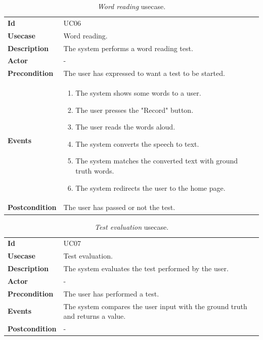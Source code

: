 \begin{table}[h!t]
    \centering
    \caption{\emph{Word reading} usecase.}
    \label{tab:uc:word}
    \centering
    \begin{tabular}{l | p{80mm}}
        \textbf{Id}            & UC06                                                 \\
        \textbf{Usecase}       & Word reading.                                        \\
        \textbf{Description}   & The system performs a word reading test.             \\
        \textbf{Actor}         & -                                                    \\
        \textbf{Precondition}  & The user has expressed to want a test to be started. \\
        \textbf{Events}        & \begin{enumerate}
            \item The system shows some words to a user.
            \item The user presses the "Record" button.
            \item The user reads the words aloud.
            \item The system converts the speech to text.
            \item The system matches the converted text with ground truth words.
            \item The system redirects the user to the home page.
        \end{enumerate}                           \\
        \textbf{Postcondition} & The user has passed or not the test.
    \end{tabular}
\end{table}

\begin{table}[h!t]
    \centering
    \caption{\emph{Test evaluation} usecase.}
    \label{tab:uc:evaluation}
    \centering
    \begin{tabular}{l | p{80mm}}
        \textbf{Id}            & UC07                                                                          \\
        \textbf{Usecase}       & Test evaluation.                                                              \\
        \textbf{Description}   & The system evaluates the test performed by the user.                          \\
        \textbf{Actor}         & -                                                                             \\
        \textbf{Precondition}  & The user has performed a test.                                                \\
        \textbf{Events}        & The system compares the user input with the ground truth and returns a value. \\
        \textbf{Postcondition} & -
    \end{tabular}
\end{table}

